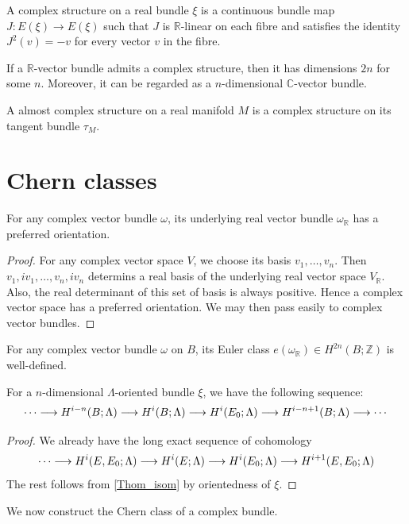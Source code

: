 	\begin{defn}
		A complex structure on a real bundle $\xi$ is a continuous bundle map $J:E(\xi)\to E(\xi)$ such that $J$ is $\mathbb{R}$-linear on each fibre and satisfies the identity $J^2(v)=-v$ for every vector $v$ in the fibre. 
	\end{defn}
	\begin{coro}
		If a $\mathbb{R}$-vector bundle admits a complex structure, then it has dimensions $2n$ for some $n$. Moreover, it can be regarded as a $n$-dimensional $\mathbb{C}$-vector bundle. 
	\end{coro}

	\begin{defn}
		A almost complex structure on a real manifold $M$ is a complex structure on its tangent bundle $\tau_M$. 
	\end{defn}

\section{Chern classes}

	\begin{lemma}
		For any complex vector bundle $\omega$, its underlying real vector bundle $\omega_\mathbb{R}$ has a preferred orientation. 
	\end{lemma}
	\begin{proof}
		For any complex vector space $V$, we choose its basis $v_1,\dots,v_n$. Then $v_1,iv_1,\dots,v_n,iv_n$ determins a real basis of the underlying real vector space $V_\mathbb{R}$. Also, the real determinant of this set of basis is always positive. Hence a complex vector space has a preferred orientation. We may then pass easily to complex vector bundles. 
	\end{proof}

	\begin{coro}
		For any complex vector bundle $\omega$ on $B$, its Euler class $e(\omega_\mathbb{R})\in H^{2n}(B;\mathbb{Z})$ is well-defined. 
	\end{coro}

	\begin{thm}\label{Gysin_seq}
		For a $n$-dimensional $\Lambda$-oriented bundle $\xi$, we have the following sequence: 
		\[ \cdots\longrightarrow H^{i-n}(B;\Lambda)\longrightarrow H^i(B;\Lambda)\longrightarrow H^i(E_0;\Lambda)\longrightarrow H^{i-n+1}(B;\Lambda)\longrightarrow\cdots \]
	\end{thm}
	\begin{proof}
		We already have the long exact sequence of cohomology
		\[ \cdots\longrightarrow H^i(E,E_0;\Lambda)\longrightarrow H^i(E;\Lambda)\longrightarrow H^i(E_0;\Lambda)\longrightarrow H^{i+1}(E,E_0;\Lambda) \]
		The rest follows from \cref{Thom_isom} by orientedness of $\xi$. 
	\end{proof}
	We now construct the Chern class of a complex bundle. 

